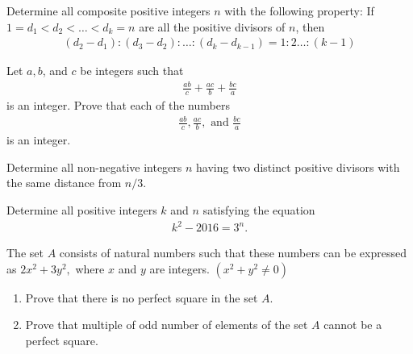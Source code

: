\documentclass[problems.tex]{subfile}
\begin{document}
	\begin{problem}
		Determine all composite positive integers $n$ with the following property: If $1 = d_1 < d_2 <
		\dots < d_k = n$ are all the positive divisors of $n$, then
		\begin{align*}
			(d_2-d_1):(d_3-d_2):\dots : (d_k - d_{k-1}) = 1:2\dots :(k-1)
		\end{align*}
	\end{problem}

	\begin{problem}
		Let $a,b$, and $c$ be integers such that
		\begin{align*}
			\frac{ab}{c} + \frac{ac}{b} + \frac{bc}{a}
		\end{align*}
		is an integer. Prove that each of the numbers
		\begin{align*}
			\frac{ab}{c} , \frac{ac}{b}, \text{ and } \frac{bc}{a}
		\end{align*}
		is an integer.
	\end{problem}

	\begin{problem}
		Determine all non-negative integers $n$ having two distinct positive divisors with the same distance from $n/3$.
	\end{problem}

	\begin{problem}
		Determine all positive integers $k$ and $n$ satisfying the equation
		\begin{align*}
			k^2 - 2016 = 3^n.
		\end{align*}
	\end{problem}

	\begin{problem}
		The set $A$ consists of natural numbers such that these numbers can be expressed as $2x^2+3y^2,$ where $x$ and $y$ are integers. $(x^2+y^2\not=0)$
		\begin{enumerate}
			\item Prove that there is no perfect square in the set $A.$
			\item Prove that multiple of odd number of elements of the set $A$ cannot be a perfect square.
		\end{enumerate}
	\end{problem}
\end{document}
